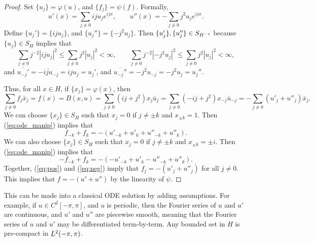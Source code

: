 \documentclass{homework}
\begin{document}
\begin{arabicparts}
\begin{proof}
			Set $\{u_j\} = \varphi(u)$, and $\{f_j\} = \psi(f)$. Formally,
			\begin{equation}
				\label{eq:formal_deriv}
				u'(x) = \sum_{j\ne0}iju_je^{ijx}, \qquad u''(x) = -\sum_{j\ne0}j^2u_je^{ijx}.
			\end{equation}
			Define $\{u_j'\} = \{iju_j\}$, and $\{u_j''\} = \{-j^2u_j\}$. Then $\{u_j'\}, \{u_j''\} \in S_{H^{-1}}$ because $\{u_j\} \in S_H$ implies that
			\begin{equation}
				\sum_{j\ne0}j^{-2}|iju_j|^2 \le \sum_{j\ne0} j^2|u_j|^2 < \infty, \qquad \sum_{j\ne0}j^{-2}|-j^2u_j|^2 \le \sum_{j\ne0}j^2|u_j|^2 < \infty,
			\end{equation}
			and $\overline{u_{-j}'} = \overline{-iju_{-j}} =iju_j=u_j'$, and $\overline{u_{-j}''} = \overline{-j^2u_{-j}} = -j^2u_j = u_j''$.
			
			Thus, for all $x\in H$, if $\{x_j\} = \varphi(x)$, then
			\begin{equation}
				\label{eq:ode_manip}
				 \sum_{j\ne0}f_j\bar{x}_j = f(x) = B(x,u)= \sum_{j\ne0}(ij + j^2)x_j\bar{u}_j = \sum_{j\ne 0}(-ij+j^2)x_{-j}\bar{u}_{-j} = -\sum_{j\ne0}(u'_j + u''_j)\bar{x}_j.
			\end{equation}
			We can choose $\{x_j\} \in S_H$ such that $x_j = 0$ if $j \ne \pm k$ and $x_{\pm k} = 1$. Then (\ref{eq:ode_manip}) implies that
			\begin{equation}
				\label{eq:pos}
				f_{-k} + f_k = -(u'_{-k} + u'_k + u''_{-k}+u''_k).
			\end{equation}
			We can also choose $\{x_j\} \in S_H$ such that $x_j = 0$ if $j\ne \pm k$ and $x_{\pm k} = \pm i$. Then (\ref{eq:ode_manip}) implies that
			\begin{equation}
				\label{eq:neg}
				-f_{-k} + f_k = -(-u'_{-k} + u'_k -u''_{-k} + u''_k).
			\end{equation}
			Together, (\ref{eq:pos}) and (\ref{eq:neg}) imply that $f_j = -(u'_j + u''_j)$ for all $j\ne0$. This implies that $f = -(u' + u'')$ by the linearity of $\psi$.
		
			\end{proof}	
			
			This can be made into a classical ODE solution by adding assumptions. For example, if $u \in C^2[-\pi,\pi]$, and $u$ is periodic, then the Fourier series of $u$ and $u'$ are continuous, and $u'$ and $u''$ are piecewise smooth, meaning that the Fourier series of $u$ and $u'$ may be differentiated term-by-term.
		\questionpart
		Any bounded set in $H$ is pre-compact in ${L^2(-\pi,\pi)}$.
		

\end{arabicparts}
\end{document}
